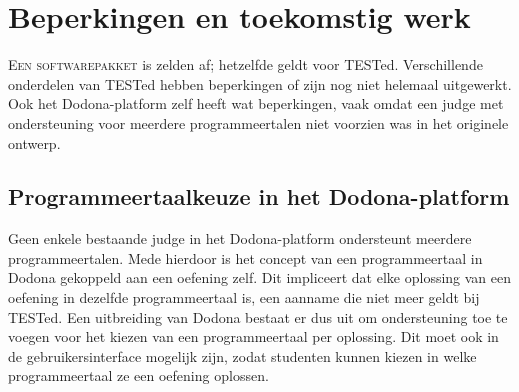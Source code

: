 \chapter{Beperkingen en toekomstig werk}\label{ch:beperkingen-en-toekomstig-werk}

\lettrine{E}{en softwarepakket} is zelden af;
hetzelfde geldt voor TESTed.
Verschillende onderdelen van TESTed hebben beperkingen of zijn nog niet helemaal uitgewerkt.
Ook het Dodona-platform zelf heeft wat beperkingen, vaak omdat een judge met ondersteuning voor meerdere programmeertalen niet voorzien was in het originele ontwerp.

\section{Programmeertaalkeuze in het Dodona-platform}\label{sec:programmeertaalkeuze-in-het-dodona-platform}

Geen enkele bestaande judge in het Dodona-platform ondersteunt meerdere programmeertalen.
Mede hierdoor is het concept van een programmeertaal in Dodona gekoppeld aan een oefening zelf.
Dit impliceert dat elke oplossing van een oefening in dezelfde programmeertaal is, een aanname die niet meer geldt bij TESTed.
Een uitbreiding van Dodona bestaat er dus uit om ondersteuning toe te voegen voor het kiezen van een programmeertaal per oplossing.
Dit moet ook in de gebruikersinterface mogelijk zijn, zodat studenten kunnen kiezen in welke programmeertaal ze een oefening oplossen.

